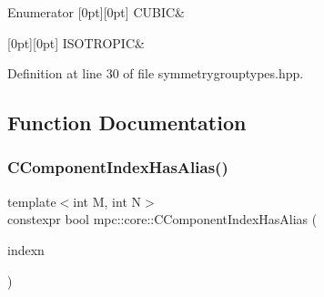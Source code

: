 \begin{DoxyEnumFields}{Enumerator}
[0pt][0pt]{}\mbox{\label{namespacempc_1_1core_a9d979684062547055a0ef5c13077bad8accd681e34e5e40fbce74618c3ccffcff}} 
C\+U\+B\+IC&\\
\hline

[0pt][0pt]{}\mbox{\label{namespacempc_1_1core_a9d979684062547055a0ef5c13077bad8a099d59049574174a1c19567d38b479c2}} 
I\+S\+O\+T\+R\+O\+P\+IC&\\
\hline

\end{DoxyEnumFields}


Definition at line 30 of file symmetrygrouptypes.\+hpp.



\subsection{Function Documentation}
\mbox{\label{namespacempc_1_1core_a41f80a8b9f9225f1642eeb1673a7390c}} 
\subsubsection{\texorpdfstring{C\+Component\+Index\+Has\+Alias()}{CComponentIndexHasAlias()}\hspace{0.1cm}{\footnotesize\ttfamily [1/4]}}
{\footnotesize\ttfamily template$<$int M, int N$>$ \\
constexpr bool mpc\+::core\+::\+C\+Component\+Index\+Has\+Alias (\begin{DoxyParamCaption}\item[{const \mbox{\hyperlink{classmpc_1_1core_1_1_c_tensor_rank2_component_index}{mpc\+::core\+::\+C\+Tensor\+Rank2\+Component\+Index}}$<$ M, N $>$ \&}]{indexn }\end{DoxyParamCaption})\hspace{0.3cm}{\ttfamily [inline]}}



